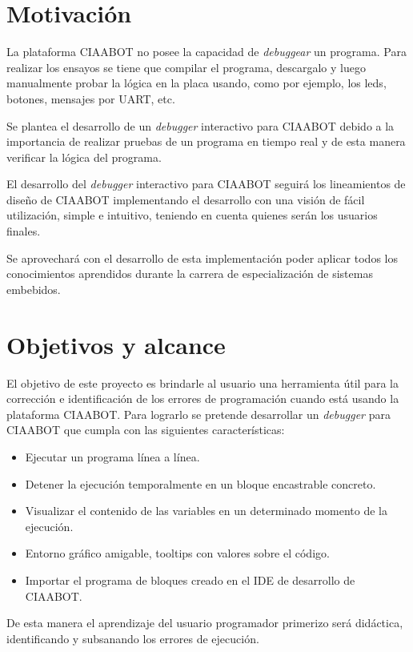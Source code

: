 
\section{Motivación}
\label{Motivación}

La plataforma CIAABOT no posee la capacidad de \emph{debuggear} un programa.
Para realizar los ensayos se tiene que compilar el programa, descargalo y luego manualmente probar la lógica en la placa usando, como por ejemplo, los leds, botones, mensajes por UART, etc.

Se plantea el desarrollo de un \emph{debugger} interactivo para CIAABOT debido a la
importancia de realizar pruebas de un programa en tiempo real y de esta manera verificar la lógica del programa.

El desarrollo del \emph{debugger} interactivo para CIAABOT seguirá los lineamientos
de diseño de CIAABOT implementando el desarrollo con una visión de
fácil utilización, simple e intuitivo, teniendo en cuenta quienes serán los usuarios
finales.

Se aprovechará con el desarrollo de esta implementación poder aplicar todos los
conocimientos aprendidos durante la carrera de especialización de sistemas embebidos.



\section{Objetivos y alcance}
\label{Objetivos y alcance}

El objetivo de este proyecto es brindarle al usuario una herramienta útil para la
corrección e identificación de los errores de programación cuando está usando
la plataforma CIAABOT. Para lograrlo se pretende desarrollar un \emph{debugger} para
CIAABOT que cumpla con las siguientes características: 

\begin{itemize}
	\item Ejecutar un programa línea a línea.
	\item Detener la ejecución temporalmente en un bloque encastrable concreto.
	\item Visualizar el contenido de las variables en un determinado momento de la
	ejecución.
	\item Entorno gráfico amigable, tooltips con valores sobre el código.
	\item Importar el programa de bloques creado en el IDE de desarrollo de CIAABOT.	
\end{itemize}

De esta manera el aprendizaje del usuario programador primerizo será didáctica,
identificando y subsanando los errores de ejecución.








